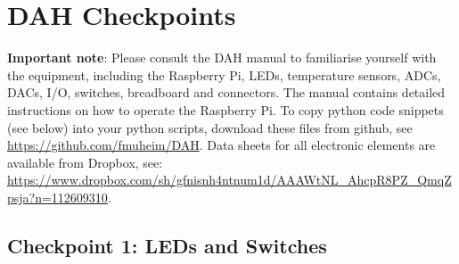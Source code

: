 \chapter{DAH Checkpoints}
\label{sec:checkpoints}
\vspace*{-0.99cm}
{\bf Important note}: Please consult the DAH manual to familiarise yourself with the equipment, including the Raspberry Pi, LEDs, temperature sensors, ADCs, DACs, I/O, switches, breadboard and connectors.
The manual contains detailed instructions on how to operate the Raspberry Pi.
To copy python code snippets (see below) into your python scripts, download these files from github, see \url{https://github.com/fmuheim/DAH}.
Data sheets for all electronic elements are available from Dropbox, see: \url{https://www.dropbox.com/sh/gfnisnh4ntnum1d/AAAWtNL_AhcpR8PZ_QmqZpsja?n=112609310}.  

\section{Checkpoint 1: LEDs and Switches}


